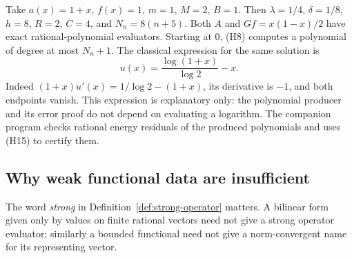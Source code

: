 \begin{example}
\label{ex:pde}
Take \(a(x)=1+x\), \(f(x)=1\), \(m=1\), \(M=2\), \(B=1\).
Then \(\lambda=1/4\), \(\delta=1/8\), \(h=8\), \(R=2\), \(C=4\), and
\(N_n=8(n+5)\). Both \(A\) and \(Gf=x(1-x)/2\) have exact rational-polynomial
evaluators. Starting at \(0\), (H8) computes a polynomial of degree at most
\(N_n+1\). The classical expression for the same solution is
\[
                       u(x)=\frac{\log(1+x)}{\log 2}-x .
\]
Indeed \((1+x)u'(x)=1/\log2-(1+x)\), its derivative is \(-1\), and both
endpoints vanish. This expression is explanatory only: the polynomial
producer and its error proof do not depend on evaluating a logarithm.
The companion program checks rational energy residuals of the produced
polynomials and uses (H15) to certify them.
\end{example}

\subsection{Why weak functional data are insufficient}
\label{subsec:riesz}

The word \emph{strong} in Definition~\ref{def:strong-operator} matters.
A bilinear form given only by values on finite rational vectors need not
give a strong operator evaluator; similarly a bounded functional need not
give a norm-convergent name for its representing vector.

